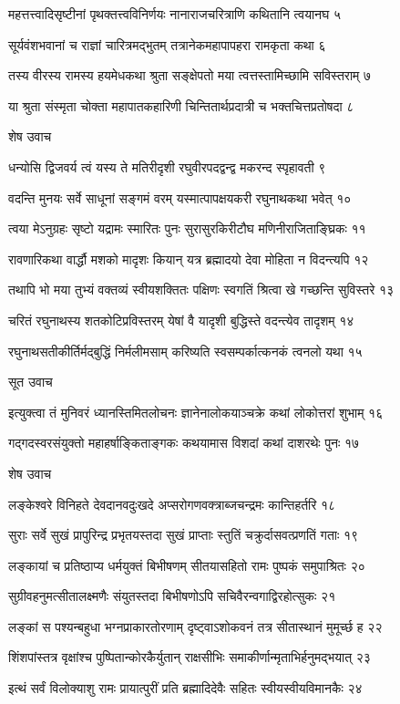 महत्तत्त्वादिसृष्टीनां पृथक्तत्त्वविनिर्णयः
नानाराजचरित्राणि कथितानि त्वयानघ ५

सूर्यवंशभवानां च राज्ञां चारित्रमद्भुतम्
तत्रानेकमहापापहरा रामकृता कथा ६

तस्य वीरस्य रामस्य हयमेधकथा श्रुता
सङ्क्षेपतो मया त्वत्तस्तामिच्छामि सविस्तराम् ७

या श्रुता संस्मृता चोक्ता महापातकहारिणी
चिन्तितार्थप्रदात्री च भक्तचित्तप्रतोषदा ८

शेष उवाच

धन्योसि द्विजवर्य त्वं यस्य ते मतिरीदृशी
रघुवीरपदद्वन्द्व मकरन्द स्पृहावती ९

वदन्ति मुनयः सर्वे साधूनां सङ्गमं वरम्
यस्मात्पापक्षयकरी रघुनाथकथा भवेत् १०

त्वया मेऽनुग्रहः सृष्टो यद्रामः स्मारितः पुनः
सुरासुरकिरीटौघ मणिनीराजिताङ्घ्रिकः ११

रावणारिकथा वार्द्धौ मशको मादृशः कियान्
यत्र ब्रह्मादयो देवा मोहिता न विदन्त्यपि १२

तथापि भो मया तुभ्यं वक्तव्यं स्वीयशक्तितः
पक्षिणः स्वगतिं श्रित्वा खे गच्छन्ति सुविस्तरे १३

चरितं रघुनाथस्य शतकोटिप्रविस्तरम्
येषां वै यादृशी बुद्धिस्ते वदन्त्येव तादृशम् १४

रघुनाथसतीकीर्तिर्मद्बुद्धिं निर्मलीमसाम्
करिष्यति स्वसम्पर्कात्कनकं त्वनलो यथा १५

सूत उवाच

इत्युक्त्वा तं मुनिवरं ध्यानस्तिमितलोचनः
ज्ञानेनालोकयाञ्चक्रे कथां लोकोत्तरां शुभाम् १६

गद्गदस्वरसंयुक्तो महाहर्षाङ्किताङ्गकः
कथयामास विशदां कथां दाशरथेः पुनः १७

शेष उवाच

लङ्केश्वरे विनिहते देवदानवदुःखदे
अप्सरोगणवक्त्राब्जचन्द्रमः कान्तिहर्तरि १८

सुराः सर्वे सुखं प्रापुरिन्द्र प्रभृतयस्तदा
सुखं प्राप्ताः स्तुतिं चक्रुर्दासवत्प्रणतिं गताः १९

लङ्कायां च प्रतिष्ठाप्य धर्मयुक्तं बिभीषणम्
सीतयासहितो रामः पुष्पकं समुपाश्रितः २०

सुग्रीवहनुमत्सीतालक्ष्मणैः संयुतस्तदा
बिभीषणोऽपि सचिवैरन्वगाद्विरहोत्सुकः २१

लङ्कां स पश्यन्बहुधा भग्नप्राकारतोरणाम्
दृष्ट्वाऽशोकवनं तत्र सीतास्थानं मुमूर्च्छ ह २२

शिंशपांस्तत्र वृक्षांश्च पुष्पितान्कोरकैर्युतान्
राक्षसीभिः समाकीर्णान्मृताभिर्हनुमद्भयात् २३

इत्थं सर्वं विलोक्याशु रामः प्रायात्पुरीं प्रति
ब्रह्मादिदेवैः सहितः स्वीयस्वीयविमानकैः २४

